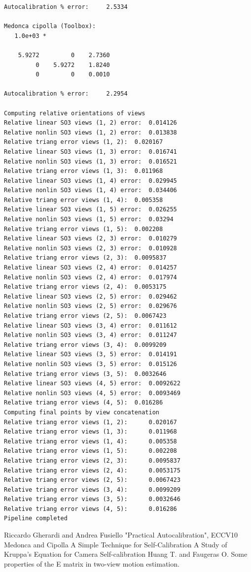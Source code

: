 \documentclass[12pt]{article}
\begin{document}
\begin{verbatim}
Autocalibration % error:	 2.5334 

Medonca cipolla (Toolbox): 
   1.0e+03 *

    5.9272         0    2.7360
         0    5.9272    1.8240
         0         0    0.0010

Autocalibration % error:	 2.2954 

Computing relative orientations of views
Relative linear SO3 views (1, 2) error:	 0.014126 
Relative nonlin SO3 views (1, 2) error:	 0.013838 
Relative triang error views (1, 2):	 0.020167 
Relative linear SO3 views (1, 3) error:	 0.016741 
Relative nonlin SO3 views (1, 3) error:	 0.016521 
Relative triang error views (1, 3):	 0.011968 
Relative linear SO3 views (1, 4) error:	 0.029945 
Relative nonlin SO3 views (1, 4) error:	 0.034406 
Relative triang error views (1, 4):	 0.005358 
Relative linear SO3 views (1, 5) error:	 0.026255 
Relative nonlin SO3 views (1, 5) error:	 0.03294 
Relative triang error views (1, 5):	 0.002208 
Relative linear SO3 views (2, 3) error:	 0.010279 
Relative nonlin SO3 views (2, 3) error:	 0.010928 
Relative triang error views (2, 3):	 0.0095837 
Relative linear SO3 views (2, 4) error:	 0.014257 
Relative nonlin SO3 views (2, 4) error:	 0.017974 
Relative triang error views (2, 4):	 0.0053175 
Relative linear SO3 views (2, 5) error:	 0.029462 
Relative nonlin SO3 views (2, 5) error:	 0.029676 
Relative triang error views (2, 5):	 0.0067423 
Relative linear SO3 views (3, 4) error:	 0.011612 
Relative nonlin SO3 views (3, 4) error:	 0.011247 
Relative triang error views (3, 4):	 0.0099209 
Relative linear SO3 views (3, 5) error:	 0.014191 
Relative nonlin SO3 views (3, 5) error:	 0.015126 
Relative triang error views (3, 5):	 0.0032646 
Relative linear SO3 views (4, 5) error:	 0.0092622 
Relative nonlin SO3 views (4, 5) error:	 0.0093469 
Relative triang error views (4, 5):	 0.016286 
Computing final points by view concatenation
Relative triang error views (1, 2):		 0.020167 
Relative triang error views (1, 3):		 0.011968 
Relative triang error views (1, 4):		 0.005358 
Relative triang error views (1, 5):		 0.002208 
Relative triang error views (2, 3):		 0.0095837 
Relative triang error views (2, 4):		 0.0053175 
Relative triang error views (2, 5):		 0.0067423 
Relative triang error views (3, 4):		 0.0099209 
Relative triang error views (3, 5):		 0.0032646 
Relative triang error views (4, 5):		 0.016286 
Pipeline completed
\end{verbatim}

\begin{thebibliography}{100}
    \addtolength{\leftmargin}{0.2in}
    \setlength{\itemindent}{-0.2in}

     Riccardo Gherardi and Andrea Fusiello "Practical Autocalibration", ECCV10
     Medonca and Cipolla A Simple Technique for Self-Calibration
     A Study of Kruppa’s Equation for Camera Self-calibration
     Huang T. and Faugeras O. Some properties of the E matrix in two-view motion estimation. 
\end{thebibliography}
\end{document}

